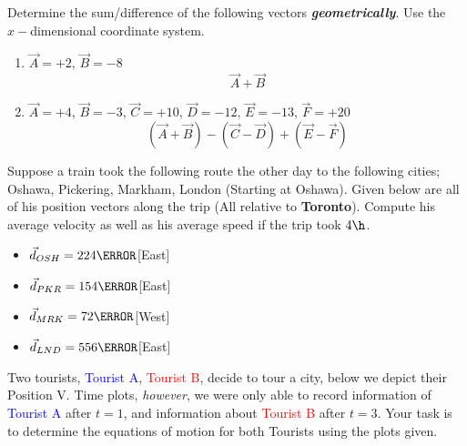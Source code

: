 \documentclass[12pt]{article} %
\begin{document}
\begin{qstn}[5]
	Determine the sum/difference of the following vectors \textbf{\emph{geometrically}}. Use the $x-$dimensional coordinate system.
	\begin{enumerate}[label=(\alph*)]
		\item $\vec A = +2$, $\vec B = -8$ $$\vec A + \vec B$$
		\vspace*{3cm}
		\item $\vec A = +4$, $\vec B = -3$, $\vec C = +10$, $\vec D = -12$, $\vec E = -13$, $\vec F = +20$   $$(\vec A + \vec B) - (\vec C - \vec D) + (\vec E - \vec F)$$

	\end{enumerate}
\end{qstn}




\begin{qstn}[6]
	Suppose a train took the following route the other day to the following cities; Oshawa, Pickering, Markham, London (Starting at Oshawa). Given below are all of his position vectors along the trip (All relative to \textbf{Toronto}). Compute his average velocity as well as his average speed if the trip took $4 \h$.
	\begin{itemize}
	\item $\vec d_{OSH} = 224\km$[East]
	\item $\vec d_{PKR} = 154\km$[East]
	\item $\vec d_{MRK} = 72\km$[West]
	\item $\vec d_{LND} = 556\km$[East]
	\end{itemize}

\end{qstn}

\begin{qstn}[8]
	Two tourists, \textcolor{blue}{Tourist A}, \textcolor{red}{Tourist B}, decide to tour a city, below we depict their Position V. Time plots, \emph{however}, we were only able to record information of \textcolor{blue}{Tourist A} after $t = 1$, and information about \textcolor{red}{Tourist B} after $t = 3$. Your task is to determine the equations of motion for both Tourists using the plots given.
	\begin{center}
		\end{center}

\end{qstn}
\end{document}
